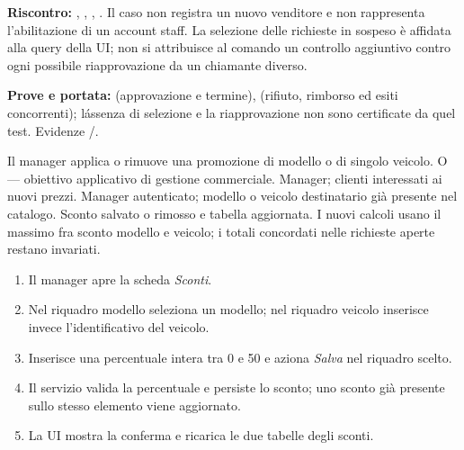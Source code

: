 \begin{flushleft}\textbf{Riscontro:} ,
, ,
. Il caso non registra un nuovo venditore e non
rappresenta l'abilitazione di un account staff. La selezione delle richieste
in sospeso \`e affidata alla query della UI; non si attribuisce al comando
un controllo aggiuntivo contro ogni possibile riapprovazione da un chiamante diverso.\end{flushleft}


\begin{flushleft}\noindent\textbf{Prove e portata:}  (approvazione e termine),  (rifiuto, rimborso ed esiti concorrenti); l\'assenza di selezione e la riapprovazione non sono certificate da quel test. Evidenze /.\end{flushleft}
\clearpage
{}
{Il manager applica o rimuove una promozione di modello o di singolo veicolo.}
{O --- obiettivo applicativo di gestione commerciale.}
{Manager; clienti interessati ai nuovi prezzi.}
{Manager autenticato; modello o veicolo destinatario gi\`a presente nel catalogo.}
{Sconto salvato o rimosso e tabella aggiornata. I nuovi calcoli usano il massimo
fra sconto modello e veicolo; i totali concordati nelle richieste aperte restano invariati.}
\principale
\begin{enumerate}
\item Il manager apre la scheda \emph{Sconti}.
\item Nel riquadro modello seleziona un modello; nel riquadro veicolo
  inserisce invece l'identificativo del veicolo.
\item Inserisce una percentuale intera tra 0 e 50 e aziona \emph{Salva} nel riquadro scelto.
\item Il servizio valida la percentuale e persiste lo sconto;
  uno sconto gi\`a presente sullo stesso elemento viene aggiornato.
\item La UI mostra la conferma e ricarica le due tabelle degli sconti.
\end{enumerate}
\alternative
